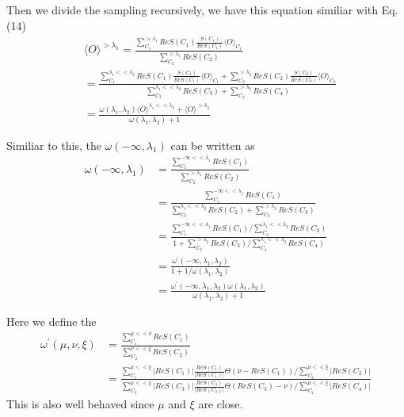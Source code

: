 \documentclass{article}
\begin{document}
    Then we divide the sampling recursively, we have this equation similiar with Eq.(14)
    \begin{equation}
        \begin{aligned}
            &\langle O \rangle^{>\lambda_{1}} = \frac{\sum^{>\lambda_{1}}_{C_{1}} ReS(C_{1}) \frac{S(C_{1})}{ReS(C_{1})} \langle O \rangle_{C_{1}}}{\sum^{>\lambda_{1}}_{C_{2}} ReS(C_{2})}\\
            &=\frac{\sum^{\lambda_{1}<<\lambda_{2}}_{C_{1}} ReS(C_{1}) \frac{S(C_{1})}{ReS(C_{1})} \langle O \rangle_{C_{1}} + \sum^{>\lambda_{2}}_{C_{2}} ReS(C_{2}) \frac{S(C_{2})}{ReS(C_{2})} \langle O \rangle_{C_{2}}  }
            {\sum^{\lambda_{1}<<\lambda_{2}}_{C_{3}} ReS(C_{3}) + \sum^{>\lambda_{2}}_{C_{4}} ReS(C_{4})}\\
            &=\frac{\omega(\lambda_{1},\lambda_{2}) \langle O \rangle^{\lambda_{1}<<\lambda_{2}} + \langle O \rangle^{>\lambda_{2}}}{\omega(\lambda_{1}, \lambda_{2})+1}
        \end{aligned}
    \end{equation}

    Similiar to this, the $\omega(-\infty,\lambda_{1})$ can be written as
    \begin{equation}
        \begin{aligned}
            \omega(-\infty,\lambda_{1}) &= \frac{\sum^{-\infty<<\lambda_{1}}_{C_{1}} ReS(C_{1})}{\sum^{>\lambda_{1}}_{C_{2}} ReS(C_{2})} \\
            &= \frac{\sum^{-\infty<<\lambda_{1}}_{C_{1}} ReS(C_{1})}{\sum^{\lambda_{1}<<\lambda_{2}}_{C_{2}} ReS(C_{2}) + \sum^{>\lambda_{2}}_{C_{3}} ReS(C_{3})} \\
            &= \frac{\sum^{-\infty<<\lambda_{1}}_{C_{1}} ReS(C_{1}) / \sum^{\lambda_{1}<<\lambda_{2}}_{C_{2}}ReS(C_{2})}
            {1+\sum^{>\lambda_{2}}_{C_{3}} ReS(C_{3})/\sum^{\lambda_{1}<<\lambda_{2}}_{C_{4}}ReS(C_{4})} \\
            &= \frac{\omega^{\prime}(-\infty, \lambda_{1}, \lambda_{2})}
            {1+1/\omega(\lambda_{1}, \lambda_{2})} \\
            &= \frac{\omega^{\prime}(-\infty, \lambda_{1}, \lambda_{2}) \omega(\lambda_{1}, \lambda_{2})}{ \omega(\lambda_{1}, \lambda_{2}) + 1}
        \end{aligned}
    \end{equation}

    Here we define the 
    \begin{equation}
        \begin{aligned}
            \omega^{\prime}(\mu, \nu, \xi) &= \frac{ \sum^{\mu<<\nu}_{C_{1}} ReS(C_{1}) }
            { \sum^{\nu<<\xi}_{C_{2}}ReS(C_{2}) } \\
            &= \frac{ \sum^{\mu<<\xi}_{C_{1}} \vert ReS(C_{1}) \vert \frac{ReS(C_{1})}{\vert ReS(C_{1}) \vert}  \Theta(\nu - ReS(C_{1})) / \sum^{\mu<<\xi}_{C_{2}} \vert ReS(C_{2}) \vert}
            { \sum^{\mu<<\xi}_{C_{3}} \vert ReS(C_{3}) \vert \frac{ReS(C_{3})}{\vert ReS(C_{3}) \vert}  \Theta(ReS(C_{3})-\nu) / \sum^{\mu<<\xi}_{C_{4}} \vert ReS(C_{4}) \vert} 
        \end{aligned}
    \end{equation}
    This is also well behaved since $\mu$ and $\xi$ are close.
    
\end{document}
